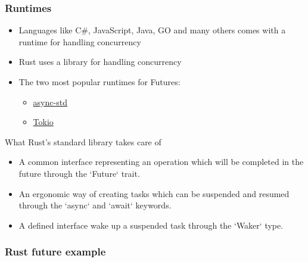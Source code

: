 \begin{frame}[fragile]
    \frametitle{Runtimes}
    \begin{itemize}
        \item Languages like C\#, JavaScript, Java, GO and many others comes with a runtime for handling concurrency
        \item Rust uses a library for handling concurrency

        \item The two most popular runtimes for Futures:
    	\begin{itemize}
    	    \item \href{https://github.com/async-rs/async-std}{async-std}
    	    \item \href{https://github.com/tokio-rs/tokio}{Tokio}
    	\end{itemize}
    \end{itemize}
% 
{\color{red}What Rust's standard library takes care of}
% 
    \begin{itemize}
        \item A {\color{red}common interface} representing an operation which will be completed in the future through the `Future` trait.
        \item An ergonomic way of {\color{red}creating tasks} which can be suspended and resumed through the `async` and `await` keywords.
        \item A defined interface wake up a suspended task through the `Waker` type.
    \end{itemize}
% 
\end{frame}
\begin{frame}[fragile]
    \frametitle{Rust future example}
% 
% 
% 
% 
% 
% 
\end{frame}
